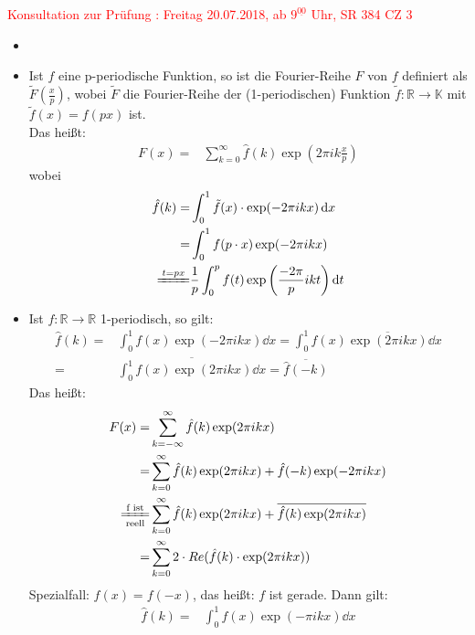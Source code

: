 \textcolor{red}{Konsultation zur Prüfung : Freitag 20.07.2018, 
ab $9^{\underline{00}}$ Uhr, SR 384 CZ 3}

\begin{Bemerkung}{
	\begin{itemize}
		\item[ ]
		\item Ist $f$ eine p-periodische Funktion, so ist die Fourier-Reihe $F$ 
		von $f$ definiert als $\tilde{F}(\frac{x}{p})$, wobei $\tilde{F}$ die 
		Fourier-Reihe der (1-periodischen) Funktion $\tilde{f}: \mathbb{R} 
		\rightarrow \mathbb{K}$ mit $\tilde{f}(x) = f(px)$ ist. \\
		Das heißt:
		\begin{align*}
			F(x) = & \sum_{k=0}^{\infty} \hat{f}(k) \exp\left( 2\pi i k 
				\frac{x}{p}\right)
		\end{align*}
		wobei
		\begin{align*}
			\hat{f} (k) = & \int_0^1 \tilde{f}(x) \cdot 
				\exp(-2\pi i k x) \dd{x} \\
			 = & \int_0^1 f(p\cdot x)\exp(-2\pi i k x) \\
			\xlongequal{t = px} & \frac{1}{p}\int_0^p f(t) 
			\exp\left( \frac{-2\pi}{p}ikt \right) \dd{t}
		\end{align*}
		\item Ist $f: \mathbb{R} \rightarrow \mathbb{R}$ 1-periodisch, so 
		gilt:
		\begin{align*}
			\hat{f}(k) = & \int_0^1 f(x) \exp( -2\pi i k x) \dd{x}	
			= \int_0^1 f(x) \overline{\exp(2\pi i k x)} \dd{x} \\
			= & \overline{\int_0^1 f(x) \exp(2\pi i k x) \dd{x}} = 
			\overline{\hat{f}(-k)}			
		\end{align*}		
		Das heißt:
		\begin{align}
			F(x) = & \sum_{k= - \infty}^{\infty} \hat{f}(k) \exp(2\pi i k x) 
				\notag \\ 
			= &\sum_{k=0}^{\infty} \hat{f}(k) \exp(2\pi ikx) + \hat{f}(-k) 
			\exp(-2\pi i kx) \notag \\
			\xlongequal[\text{reell}]{\text{f ist}} &
			\sum_{k=0}^{\infty} \hat{f}(k)\exp(2\pi ikx) 
				+ \overline{\hat{f}(k) \exp(2\pi ikx)} \notag \\ 
			= & \sum_{k=0}^{\infty} 2 \cdot Re(\hat{f}(k) \cdot 
			\exp(2\pi i kx)) \label{vl_19_gl_1}
		\end{align}
		Spezialfall: $f(x) = f(-x)$, das heißt: $f$ ist gerade. Dann gilt:
		\begin{align*}
			\hat{f}(k) = & \int_0^1 f(x) \exp(-\pi ikx) \dd{x} \\

\end{align*}
\end{itemize}}
\end{Bemerkung}
